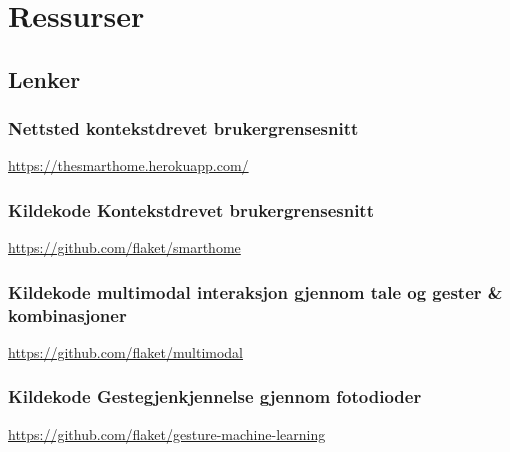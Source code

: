 \section{Ressurser}
\subsection{Lenker}
\subsubsection{Nettsted kontekstdrevet brukergrensesnitt}
\url{https://thesmarthome.herokuapp.com/}
\subsubsection{Kildekode Kontekstdrevet brukergrensesnitt}
\url{https://github.com/flaket/smarthome}
\subsubsection{Kildekode multimodal interaksjon gjennom tale og gester \& kombinasjoner}
\url{https://github.com/flaket/multimodal}
\subsubsection{Kildekode Gestegjenkjennelse gjennom fotodioder}
\url{https://github.com/flaket/gesture-machine-learning}

